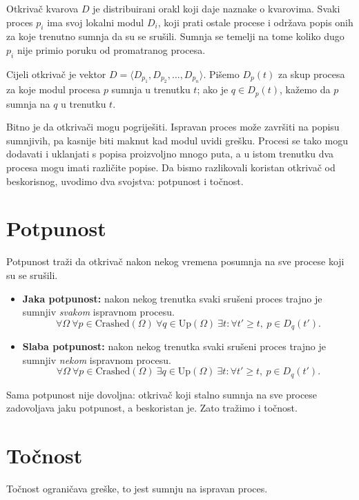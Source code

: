 \documentclass[11pt,a4paper]{article}
\newcommand{\Crashed}{\mathrm{Crashed}}
\newcommand{\Up}{\mathrm{Up}}
\begin{document}
Otkrivač kvarova $D$ je distribuirani orakl koji daje naznake o kvarovima. Svaki
proces $p_i$ ima svoj lokalni modul $D_i$, koji prati ostale procese i održava
popis onih za koje trenutno sumnja da su se srušili. Sumnja se temelji na tome
koliko dugo $p_i$ nije primio poruku od promatranog procesa.

Cijeli otkrivač je vektor $D = \langle D_{p_1}, D_{p_2}, \dots, D_{p_n} \rangle$.
Pišemo $D_p(t)$ za skup procesa za koje modul procesa $p$ sumnja u trenutku $t$;
ako je $q \in D_p(t)$, kažemo da $p$ sumnja na $q$ u trenutku $t$.

Bitno je da otkrivači mogu pogriješiti. Ispravan proces može završiti na popisu
sumnjivih, pa kasnije biti maknut kad modul uvidi grešku. Procesi se tako mogu
dodavati i uklanjati s popisa proizvoljno mnogo puta, a u istom trenutku dva
procesa mogu imati različite popise. Da bismo razlikovali koristan otkrivač od
beskorisnog, uvodimo dva svojstva: potpunost i točnost.

\section{Potpunost}

Potpunost traži da otkrivač nakon nekog vremena posumnja na sve procese koji su
se srušili.

\begin{itemize}
  \item \textbf{Jaka potpunost:} nakon nekog trenutka svaki srušeni proces trajno
  je sumnjiv \emph{svakom} ispravnom procesu.
  \[
    \forall \Omega\ \forall p \in \Crashed(\Omega)\ \forall q \in \Up(\Omega)\
    \exists t : \forall t' \ge t,\ p \in D_q(t').
  \]
  \item \textbf{Slaba potpunost:} nakon nekog trenutka svaki srušeni proces trajno
  je sumnjiv \emph{nekom} ispravnom procesu.
  \[
    \forall \Omega\ \forall p \in \Crashed(\Omega)\ \exists q \in \Up(\Omega)\
    \exists t : \forall t' \ge t,\ p \in D_q(t').
  \]
\end{itemize}

Sama potpunost nije dovoljna: otkrivač koji stalno sumnja na sve procese
zadovoljava jaku potpunost, a beskoristan je. Zato tražimo i točnost.

\section{Točnost}

Točnost ograničava greške, to jest sumnju na ispravan proces.
\end{document}

